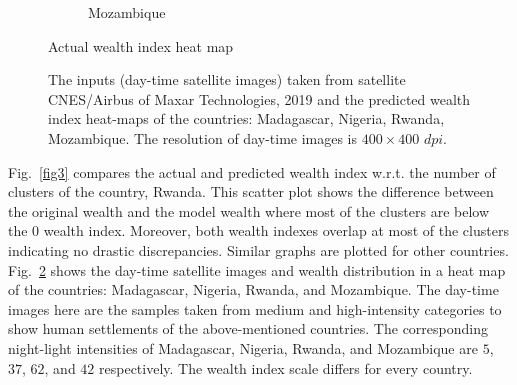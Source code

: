 \begin{figure}[!ht]
\begin{subfigure}[t]{0.22\textwidth}
\begin{picture}
         \end{picture}
         \caption{Mozambique}
         \label{fig:three sin x}
     \end{subfigure}
     \hfill
     \newline
     \newline
     \newline
    \hspace{3cm} Actual wealth index heat map
     
     \caption{The inputs (day-time satellite images) taken from satellite CNES/Airbus of Maxar Technologies, 2019 and the predicted wealth index heat-maps of the countries: Madagascar, Nigeria, Rwanda, Mozambique. The resolution of day-time images is $400\times 400$ $dpi$.}
     \label{fig:predicted_hmap}
    
    
\end{figure}



Fig.~\ref{fig3} compares the actual and predicted wealth index w.r.t. the number of clusters of the country, Rwanda. This scatter plot shows the difference between the original wealth and the model wealth where most of the clusters are below the $0$ wealth index. Moreover, both wealth indexes overlap at most of the clusters indicating no drastic discrepancies. Similar graphs are plotted for other countries. Fig.~\ref{fig:predicted_hmap} shows the day-time satellite images and wealth distribution in a heat map of the countries: Madagascar, Nigeria, Rwanda, and Mozambique. The day-time images here are the samples taken from medium and high-intensity categories to show human settlements of the above-mentioned countries. The corresponding night-light intensities of Madagascar, Nigeria, Rwanda, and Mozambique are $5$, $37$, $62$, and $42$ respectively. The wealth index scale differs for every country. 
